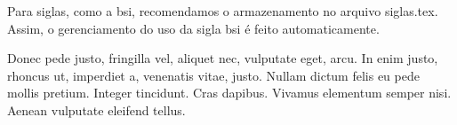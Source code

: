 Para siglas, como a \ac{bsi}, recomendamos o armazenamento no arquivo siglas.tex. Assim, o gerenciamento do uso da sigla \ac{bsi} é feito automaticamente.  

Donec pede justo, fringilla vel, aliquet nec, vulputate eget, arcu. In enim justo, rhoncus ut, imperdiet a, venenatis vitae, justo. Nullam dictum felis eu pede mollis pretium. Integer tincidunt. Cras dapibus. Vivamus elementum semper nisi. Aenean vulputate eleifend tellus.
